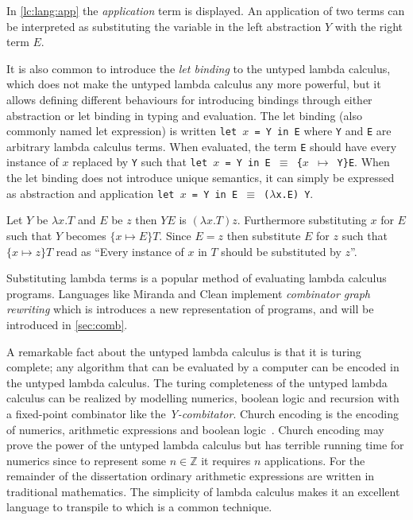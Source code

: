 In \autoref{lc:lang:app} the \textit{application} term is displayed.
An application of two terms can be interpreted as substituting the variable in the left abstraction $Y$ with the right term $E$.

It is also common to introduce the \textit{let binding} to the untyped lambda calculus, which does not make the untyped lambda calculus any more powerful, but it allows defining different behaviours for introducing bindings through either abstraction or let binding in typing and evaluation.
The let binding (also commonly named let expression) is written \texttt{let $x$ = Y in E} where \texttt{Y} and \texttt{E} are arbitrary lambda calculus terms.
When evaluated, the term \texttt{E} should have every instance of $x$ replaced by \texttt{Y} such that \texttt{let $x$ = Y in E $\equiv$ \{$x$ $\mapsto$ Y\}E}.
When the let binding does not introduce unique semantics, it can simply be expressed as abstraction and application \texttt{let $x$ = Y in E $\equiv$ ($\lambda$x.E) Y}.

\begin{exmp}
\label{ex:application}
Let $Y$ be $\lambda x . T$ and $E$ be $z$ then $Y E$ is $(\lambda x . T) z$.
Furthermore substituting $x$ for $E$ such that $Y$ becomes $\{x \mapsto E\}T$.
Since $E = z$ then substitute $E$ for $z$ such that $\{x \mapsto z\}T$ read as ``Every instance of $x$ in $T$ should be substituted by $z$''.
\end{exmp}
\begin{remark}
Substituting lambda terms is a popular method of evaluating lambda calculus programs.
Languages like Miranda and Clean implement \textit{combinator graph rewriting} which is introduces a new representation of programs, and will be introduced in \autoref{sec:comb}.
\end{remark}

A remarkable fact about the untyped lambda calculus is that it is turing complete; any algorithm that can be evaluated by a computer can be encoded in the untyped lambda calculus.
The turing completeness of the untyped lambda calculus can be realized by modelling numerics, boolean logic and recursion with a fixed-point combinator like the \textit{Y-combitator}.
Church encoding is the encoding of numerics, arithmetic expressions and boolean logic~\cite{church1985calculi}.
Church encoding may prove the power of the untyped lambda calculus but has terrible running time for numerics since to represent some $n \in \mathbb{Z}$ it requires $n$ applications.
For the remainder of the dissertation ordinary arithmetic expressions are written in traditional mathematics.
The simplicity of lambda calculus makes it an excellent language to transpile to which is a common technique.

